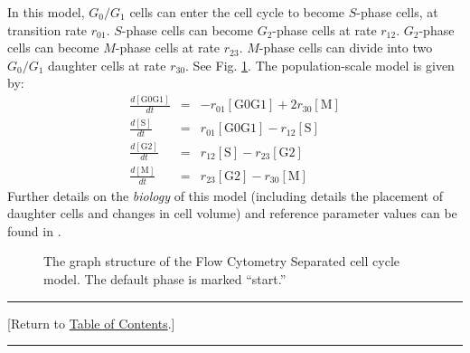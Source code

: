 \documentclass[12pt]{article}
\newcommand{\beqa}{\begin{eqnarray}}
\newcommand{\eeqa}{\end{eqnarray}}
\renewcommand{\t}[1]{\left[\mathrm{#1}\right]}
\newcommand{\TOClink}{\begin{center}\hrule\vskip-5pt\phantom{.}\hfill[Return to \hyperlink{TOC}{Table of Contents}.]\hfill\phantom{.}\vskip3pt\hrule\end{center}}
\begin{document}
In this model, $G_0/G_1$ cells can enter the cell cycle to 
become $S$-phase cells, at transition rate $r_{01}$. $S$-phase cells 
can become $G_2$-phase cells at rate $r_{12}$. 
$G_2$-phase cells can become $M$-phase cells at rate $r_{23}$. 
$M$-phase cells can divide into two $G_0/G_1$ daughter cells 
at rate $r_{30}$. 
See Fig. \ref{fig:cycle_model:flow_cytometry_separated}. The 
population-scale model is given by: 
\beqa
\frac{d\t{G0G1}}{dt} & = & -r_{01} \t{G0G1} + 2 r_{30} \t{M} \\
\frac{d\t{S}}{dt} & = &  r_{01} \t{G0G1} -r_{12} \t{S} \\
\frac{d\t{G2}}{dt} & = &  r_{12} \t{S} -r_{23} \t{G2} \\
\frac{d\t{M}}{dt} & = &  r_{23} \t{G2} -r_{30} \t{M} 
\eeqa
Further details on the \emph{biology} of this model (including 
details the placement of daughter cells and changes in cell 
volume) and reference parameter values can be found in \cite{ref:PhysiCell}. 

\begin{figure}
\begin{mdframed}[style=mystyle]
\caption{The graph structure of the Flow Cytometry Separated cell cycle model. The default phase is marked 
``start.''}
\label{fig:cycle_model:flow_cytometry_separated}
\end{mdframed}
\end{figure}

\TOClink 
\end{document}
